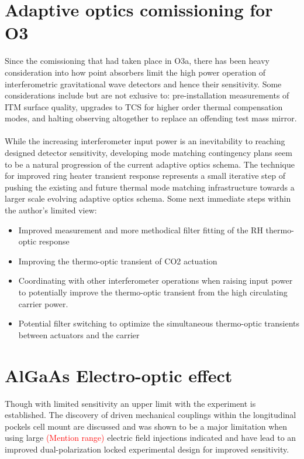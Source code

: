 \section{Adaptive optics comissioning for O3}
Since the comissioning that had taken place in O3a, there has been heavy consideration into how point absorbers limit the high power operation of interferometric gravitational wave detectors and hence their sensitivity. Some considerations include but are not exlusive to: pre-installation measurements of ITM surface quality, upgrades to TCS for higher order thermal compensation modes, and halting observing altogether to replace an offending test mass mirror. 
\\
\\
While the increasing interferometer input power is an inevitability to reaching designed detector sensitivity, developing mode matching contingency plans seem to be a natural progression of the current adaptive optics schema. The technique for improved ring heater transient response represents a small iterative step of pushing the existing and future thermal mode matching infrastructure towards a larger scale evolving adaptive optics schema. Some next immediate steps within the author's limited view:

\begin{itemize}
	\item Improved measurement and more methodical filter fitting of the RH thermo-optic response
	\item Improving the thermo-optic transient of CO2 actuation
	\item Coordinating with other interferometer operations when raising input power to potentially improve the thermo-optic transient from the high circulating carrier power.
	\item Potential filter switching to optimize the simultaneous thermo-optic transients between actuators and the carrier 
\end{itemize}

\section{AlGaAs Electro-optic effect}
Though with limited sensitivity an upper limit with the experiment is established. The discovery of driven mechanical couplings within the longitudinal pockels cell mount are discussed and was shown to be a major limitation when using large \textcolor{red}{(Mention range)} electric field injections indicated and have lead to an improved dual-polarization locked experimental design for improved sensitivity.

